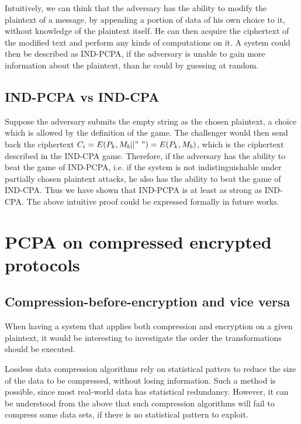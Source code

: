 Intuitively, we can think that the adversary has the ability to modify the plaintext of a message, by appending a portion of data of his own choice to it, without knowledge of the plaintext itself. He can then acquire the ciphertext of the modified text and perform any kinds of computations on it. A system could then be described as IND-PCPA, if the adversary is unable to gain more information about the plaintext, than he could by guessing at random.

\subsection{IND-PCPA vs IND-CPA}

Suppose the adversary submits the empty string as the chosen plaintext, a choice which is allowed by the definition of the game. The challenger would then send back the ciphertext \begin{math}C_i = E(P_k, M_b||"\ ") = E(P_k, M_b)\end{math}, which is the ciphertext described in the IND-CPA game. Therefore, if the adversary has the ability to beat the game of IND-PCPA, i.e. if the system is not indistinguishable under partially chosen plaintext attacks, he also has the ability to beat the game of IND-CPA. Thus we have shown that IND-PCPA is at least as strong as IND-CPA. The above intuitive proof could be expressed formally in future works.

\section{PCPA on compressed encrypted protocols}\label{sec:cepcpa}

\subsection{Compression-before-encryption and vice versa}
When having a system that applies both compression and encryption on a given plaintext, it would be interesting to investigate the order the transformations should be executed.

Lossless data compression algorithms rely on statistical patters to reduce the size of the data to be compressed, without losing information. Such a method is possible, since most real-world data has statistical redundancy. However, it can be understood from the above that such compression algorithms will fail to compress some data sets, if there is no statistical pattern to exploit.

